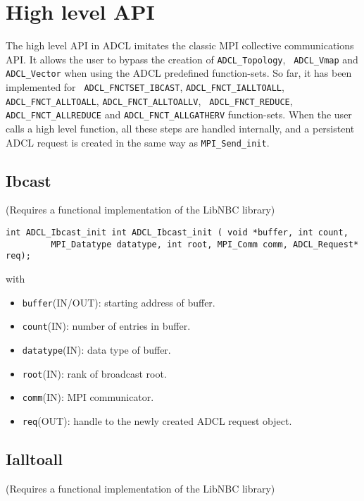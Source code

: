 \section{High level API}


The high level API in ADCL imitates the classic MPI collective communications
API. It allows the user to bypass the creation of {\tt ADCL\_Topology}, {\tt
  ADCL\_Vmap} and {\tt ADCL\_Vector} when using the ADCL predefined
function-sets. So far, it has been implemented for {\tt
  ADCL\_FNCTSET\_IBCAST}, {\tt ADCL\_FNCT\_IALLTOALL}, {\tt
  ADCL\_FNCT\_ALLTOALL}, {\tt ADCL\_FNCT\_ALLTOALLV}, {\tt
  ADCL\_FNCT\_REDUCE}, {\tt ADCL\_FNCT\_ALLREDUCE} and {\tt ADCL\_FNCT\_ALLGATHERV} function-sets. When the user calls a high
level function, all these steps are handled internally, and a persistent ADCL
request is created in the same way as {\tt MPI\_Send\_init}.

\subsection{Ibcast}

(Requires a functional implementation of the LibNBC library)

\begin{verbatim}
int ADCL_Ibcast_init int ADCL_Ibcast_init ( void *buffer, int count,
         MPI_Datatype datatype, int root, MPI_Comm comm, ADCL_Request* req);
\end{verbatim}
with
\begin{itemize}
\item {\tt buffer}(IN/OUT): starting address of buffer.
\item {\tt count}(IN): number of entries in buffer.
\item {\tt datatype}(IN): data type of buffer.
\item {\tt root}(IN): rank of broadcast root.
\item {\tt comm}(IN): MPI communicator.
\item {\tt req}(OUT): handle to the newly created ADCL request object.
\end{itemize}

\subsection{Ialltoall}

(Requires a functional implementation of the LibNBC library)

